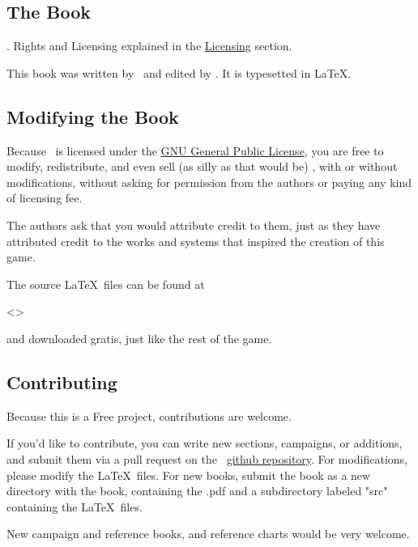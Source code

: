 \subsection{The Book}
\par
{} \zandy . Rights and Licensing explained in the \hyperlink{Licensing}{Licensing} section. 

\par
This book was written by \zandy\, and edited by \sam . It is typesetted in \LaTeX .

\subsection{Modifying the Book}

\par
Because \getTitle\, is licensed under the \hyperlink{Licensing}{GNU General Public License}, you are free to modify, redistribute, and even sell (as silly as that would be) \getTitle , with or without modifications, without asking for permission from the authors or paying any kind of licensing fee.

\par
The authors ask that you would attribute credit to them, just as they have attributed credit to the works and systems that inspired the creation of this game.

\par
The source \LaTeX\, files can be found at 
\par
<\website >
\par
and downloaded gratis, just like the rest of the game.

\subsection{Contributing}

\par
Because this is a Free project, contributions are welcome.

\par
If you'd like to contribute, you can write new sections, campaigns, or additions, and submit them via a pull request on the \getTitle\, \hyperlink{https://github.com/Zanderwohl/TechSense}{github repository}. For modifications, please modify the \LaTeX\, files. For new books, submit the book as a new directory with the book, containing the .pdf and a subdirectory labeled "src" containing the \LaTeX\, files.

\par
New campaign and reference books, and reference charts would be very welcome.

